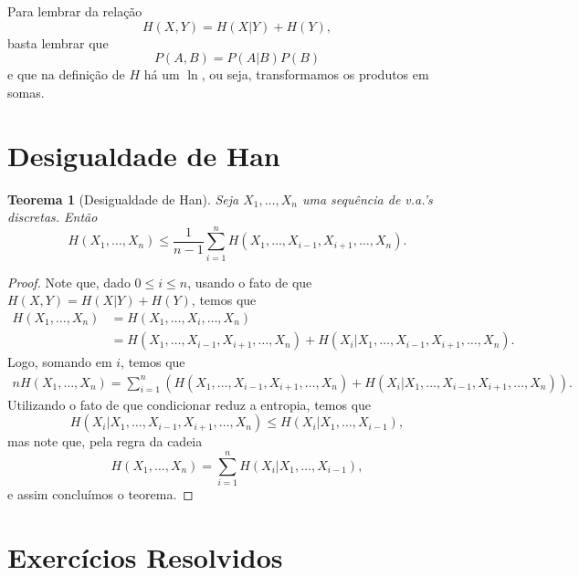 \documentclass[12pt,a4paper,oneside]{book}
\newtheorem{theorem}{Teorema}[section]
\theoremstyle{definition}
\theoremstyle{remark}
\numberwithin{equation}{section}
\begin{document}
\begin{tcolorbox}[colback = yellow!60]
Para lembrar da relação $$H(X,Y) = H(X|Y)+H(Y),$$ basta lembrar que
$$P(A,B) = P(A|B)P(B) $$
e que na definição de $H$ há um $\ln$, ou seja, transformamos os produtos em somas.
\end{tcolorbox}
\newpage
\section{Desigualdade de Han}

\begin{theorem}[Desigualdade de Han]  Seja $X_1,\dots,X_n$ uma sequência de v.a.'s discretas. Então
$$H(X_1,\dots,X_n)\leq \dfrac{1}{n-1}\sum_{i=1}^n H(X_1,\dots,X_{i-1},X_{i+1},\dots,X_n). $$
\end{theorem}

\begin{proof}
Note que, dado $0\leq i\leq n$, usando o fato de que $H(X,Y) = H(X|Y)+H(Y)$, temos que
\begin{align*}
H(X_1,\dots,X_n) &= H(X_1,\dots,X_i,\dots,X_n) \\
&= H(X_1,\dots,X_{i-1},X_{i+1},\dots,X_n)+H(X_i|X_1,\dots,X_{i-1},X_{i+1},\dots,X_n).
\end{align*}
Logo, somando em $i$, temos que
\begin{align*}
nH(X_1,\dots,X_n) = \sum_{i=1}^n \left(H(X_1,\dots,X_{i-1},X_{i+1},\dots,X_n)+H(X_i|X_1,\dots,X_{i-1},X_{i+1},\dots,X_n)\right).
\end{align*}
Utilizando o fato de que condicionar reduz a entropia, temos que
$$H(X_i|X_1,\dots,X_{i-1},X_{i+1},\dots,X_n)\leq H(X_i|X_1,\dots,X_{i-1}), $$
mas note que, pela regra da cadeia
$$H(X_1,\dots,X_n) =   \sum_{i=1}^n H(X_i|X_1,\dots,X_{i-1}),$$
e assim concluímos o teorema.
\end{proof}





















\section{Exercícios Resolvidos}
























\nocite{*}


\newpage

\printindex
\end{document}
